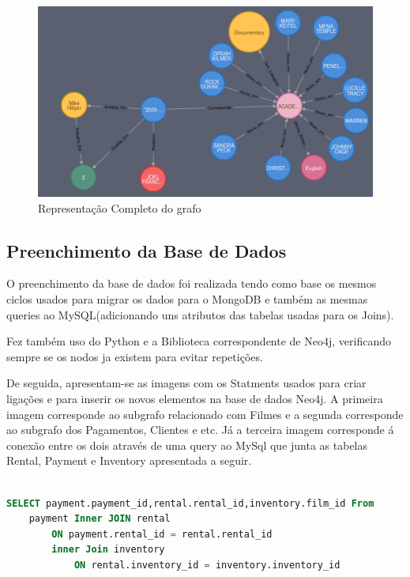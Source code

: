 \begin{figure}[H]

  \centering

  \includegraphics[width=\textwidth]{Completo.png}

  \caption {Representação Completo do grafo}

  \label {fig:Completa}

\end{figure}




\subsection{Preenchimento da Base de Dados}

O preenchimento da base de dados foi realizada tendo como base os mesmos ciclos usados para migrar os dados para o MongoDB e também as mesmas queries ao MySQL(adicionando uns atributos das tabelas usadas para os Joins). \newline
\par Fez também uso do Python e a Biblioteca correspondente de Neo4j, verificando sempre se os nodos ja existem para evitar repetições. \newline
\par De seguida, apresentam-se as imagens com os Statments usados para criar ligações e para inserir os novos elementos na base de dados Neo4j. A primeira imagem corresponde ao subgrafo relacionado com Filmes e a segunda corresponde ao subgrafo dos Pagamentos, Clientes e etc. Já a terceira imagem corresponde á conexão entre os dois através de uma query ao MySql que junta as tabelas Rental, Payment e Inventory apresentada a seguir.

\begin{lstlisting}[language=sql,caption=Query ao MySQL para fazer a conexão entre os dois subgrafos]

SELECT payment.payment_id,rental.rental_id,inventory.film_id From 
	payment Inner JOIN rental 
		ON payment.rental_id = rental.rental_id 
		inner Join inventory 
			ON rental.inventory_id = inventory.inventory_id

\end{lstlisting}

